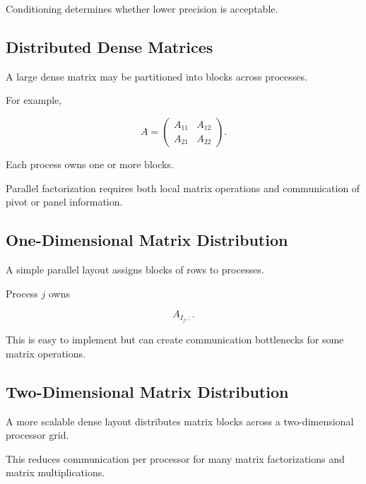 Conditioning determines whether lower precision is acceptable.

\subsection{Distributed Dense Matrices}
\label{subsec:distributed-dense-matrices}

A large dense matrix may be partitioned into blocks across processes.

For example,

\[
\boxed{
A
=
\begin{pmatrix}
A_{11}&A_{12}\\
A_{21}&A_{22}
\end{pmatrix}.
}
\]

Each process owns one or more blocks.

Parallel factorization requires both local matrix operations and
communication of pivot or panel information.

\subsection{One-Dimensional Matrix Distribution}
\label{subsec:one-dimensional-matrix-distribution}

A simple parallel layout assigns blocks of rows to processes.

Process \(j\) owns

\[
\boxed{
A_{I_j,:}.
}
\]

This is easy to implement but can create communication bottlenecks for some
matrix operations.

\subsection{Two-Dimensional Matrix Distribution}
\label{subsec:two-dimensional-matrix-distribution}

A more scalable dense layout distributes matrix blocks across a
two-dimensional processor grid.

This reduces communication per processor for many matrix factorizations and
matrix multiplications.


